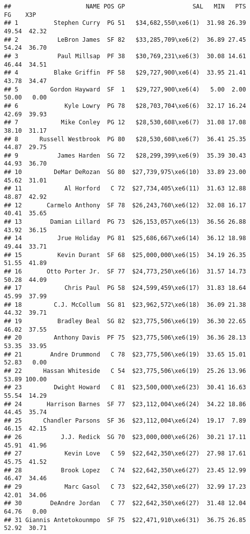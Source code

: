 \documentclass[
]{article}
\begin{document}
\begin{verbatim}
##                     NAME POS GP                   SAL   MIN   PTS    FG    X3P
## 1          Stephen Curry  PG 51   $34,682,550\xe6(1)  31.98 26.39 49.54  42.32
## 2           LeBron James  SF 82   $33,285,709\xe6(2)  36.89 27.45 54.24  36.70
## 3           Paul Millsap  PF 38   $30,769,231\xe6(3)  30.08 14.61 46.44  34.51
## 4          Blake Griffin  PF 58   $29,727,900\xe6(4)  33.95 21.41 43.78  34.47
## 5         Gordon Hayward  SF  1   $29,727,900\xe6(4)   5.00  2.00 50.00   0.00
## 6             Kyle Lowry  PG 78   $28,703,704\xe6(6)  32.17 16.24 42.69  39.93
## 7            Mike Conley  PG 12   $28,530,608\xe6(7)  31.08 17.08 38.10  31.17
## 8      Russell Westbrook  PG 80   $28,530,608\xe6(7)  36.41 25.35 44.87  29.75
## 9           James Harden  SG 72   $28,299,399\xe6(9)  35.39 30.43 44.93  36.70
## 10         DeMar DeRozan  SG 80  $27,739,975\xe6(10)  33.89 23.00 45.62  31.01
## 11            Al Horford   C 72  $27,734,405\xe6(11)  31.63 12.88 48.87  42.92
## 12       Carmelo Anthony  SF 78  $26,243,760\xe6(12)  32.08 16.17 40.41  35.65
## 13        Damian Lillard  PG 73  $26,153,057\xe6(13)  36.56 26.88 43.92  36.15
## 14          Jrue Holiday  PG 81  $25,686,667\xe6(14)  36.12 18.98 49.44  33.71
## 15          Kevin Durant  SF 68  $25,000,000\xe6(15)  34.19 26.35 51.55  41.89
## 16       Otto Porter Jr.  SF 77  $24,773,250\xe6(16)  31.57 14.73 50.28  44.09
## 17            Chris Paul  PG 58  $24,599,459\xe6(17)  31.83 18.64 45.99  37.99
## 18         C.J. McCollum  SG 81  $23,962,572\xe6(18)  36.09 21.38 44.32  39.71
## 19          Bradley Beal  SG 82  $23,775,506\xe6(19)  36.30 22.65 46.02  37.55
## 20         Anthony Davis  PF 75  $23,775,506\xe6(19)  36.36 28.13 53.35  33.95
## 21        Andre Drummond   C 78  $23,775,506\xe6(19)  33.65 15.01 52.83   0.00
## 22      Hassan Whiteside   C 54  $23,775,506\xe6(19)  25.26 13.96 53.89 100.00
## 23         Dwight Howard   C 81  $23,500,000\xe6(23)  30.41 16.63 55.54  14.29
## 24       Harrison Barnes  SF 77  $23,112,004\xe6(24)  34.22 18.86 44.45  35.74
## 25      Chandler Parsons  SF 36  $23,112,004\xe6(24)  19.17  7.89 46.15  42.15
## 26           J.J. Redick  SG 70  $23,000,000\xe6(26)  30.21 17.11 45.91  41.96
## 27            Kevin Love   C 59  $22,642,350\xe6(27)  27.98 17.61 45.75  41.52
## 28           Brook Lopez   C 74  $22,642,350\xe6(27)  23.45 12.99 46.47  34.46
## 29            Marc Gasol   C 73  $22,642,350\xe6(27)  32.99 17.23 42.01  34.06
## 30        DeAndre Jordan   C 77  $22,642,350\xe6(27)  31.48 12.04 64.76   0.00
## 31 Giannis Antetokounmpo  SF 75  $22,471,910\xe6(31)  36.75 26.85 52.92  30.71

\end{verbatim}
\end{document}
